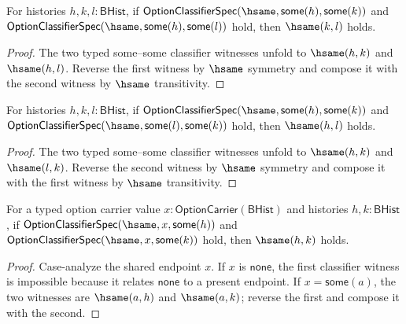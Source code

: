 \begin{theorem}
\label{thm:option-classifier-spec-hsame-right-deterministic}
For histories $h,k,l:\mathsf{BHist}$, if
$\mathsf{OptionClassifierSpec}(\hsame,\mathsf{some}(h),\mathsf{some}(k))$ and
$\mathsf{OptionClassifierSpec}(\hsame,\mathsf{some}(h),\mathsf{some}(l))$ hold,
then $\hsame(k,l)$ holds.
\end{theorem}
\begin{proof}
The two typed some--some classifier witnesses unfold to $\hsame(h,k)$ and
$\hsame(h,l)$. Reverse the first witness by $\hsame$ symmetry and compose it
with the second witness by $\hsame$ transitivity.
\end{proof}

\begin{theorem}
\label{thm:option-classifier-spec-hsame-left-deterministic}
For histories $h,k,l:\mathsf{BHist}$, if
$\mathsf{OptionClassifierSpec}(\hsame,\mathsf{some}(h),\mathsf{some}(k))$ and
$\mathsf{OptionClassifierSpec}(\hsame,\mathsf{some}(l),\mathsf{some}(k))$ hold,
then $\hsame(h,l)$ holds.
\end{theorem}
\begin{proof}
The two typed some--some classifier witnesses unfold to $\hsame(h,k)$ and
$\hsame(l,k)$. Reverse the second witness by $\hsame$ symmetry and compose it
with the first witness by $\hsame$ transitivity.
\end{proof}

\begin{theorem}
\label{thm:option-classifier-spec-hsame-some-right-confluence}
For a typed option carrier value $x:\mathsf{OptionCarrier}(\mathsf{BHist})$ and
histories $h,k:\mathsf{BHist}$, if
$\mathsf{OptionClassifierSpec}(\hsame,x,\mathsf{some}(h))$ and
$\mathsf{OptionClassifierSpec}(\hsame,x,\mathsf{some}(k))$ hold, then
$\hsame(h,k)$ holds.
\end{theorem}
\begin{proof}
Case-analyze the shared endpoint $x$. If $x$ is $\mathsf{none}$, the first
classifier witness is impossible because it relates $\mathsf{none}$ to a
present endpoint. If $x=\mathsf{some}(a)$, the two witnesses are
$\hsame(a,h)$ and $\hsame(a,k)$; reverse the first and compose it with the
second.
\end{proof}

